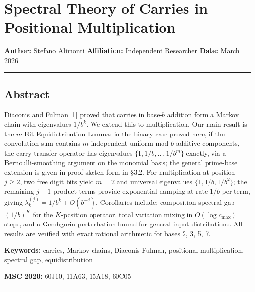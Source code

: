 \documentclass[
  11pt,
]{article}
\author{Stefano Alimonti --- stefalimonti@gmail.com}
\date{March 2026}
\begin{document}
{
\hypersetup{linkcolor=black}
\setcounter{tocdepth}{2}
\tableofcontents
}
\section{Spectral Theory of Carries in Positional
Multiplication}\label{spectral-theory-of-carries-in-positional-multiplication}

\textbf{Author:} Stefano Alimonti \textbf{Affiliation:} Independent Researcher
\textbf{Date:} March 2026

\begin{center}\rule{0.5\linewidth}{0.5pt}\end{center}

\newpage

\subsection{Abstract}\label{abstract}

Diaconis and Fulman {[}1{]} proved that carries in base-\(b\) addition form a
Markov chain with eigenvalues \(1/b^k\). We extend this to multiplication. Our
main result is the \(m\)-Bit Equidistribution Lemma: in the binary case proved
here, if the convolution sum contains \(m\) independent uniform-mod-\(b\)
additive components, the carry transfer operator has eigenvalues
\(\lbrace{}1, 1/b, \ldots, 1/b^m\rbrace{}\) exactly, via a Bernoulli-smoothing
argument on the monomial basis; the general prime-base extension is given in
proof-sketch form in §3.2. For multiplication at position \(j \geq 2\), two free
digit bits yield \(m = 2\) and universal eigenvalues
\(\lbrace{}1, 1/b, 1/b^2\rbrace{}\); the remaining \(j-1\) product terms provide
exponential damping at rate \(1/b\) per term, giving
\(\lambda_k^{(j)} = 1/b^k + O(b^{-j})\). Corollaries include: composition
spectral gap \((1/b)^K\) for the \(K\)-position operator, total variation mixing
in \(O(\log c_{\max})\) steps, and a Gershgorin perturbation bound for general
input distributions. All results are verified with exact rational arithmetic for
bases 2, 3, 5, 7.

\textbf{Keywords:} carries, Markov chains, Diaconis-Fulman, positional
multiplication, spectral gap, equidistribution

\textbf{MSC 2020:} 60J10, 11A63, 15A18, 60C05

\begin{center}\rule{0.5\linewidth}{0.5pt}\end{center}
\end{document}
